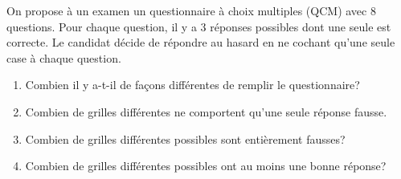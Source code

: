 \documentclass[a4paper]{article}
\newif\ifcorrection
\begin{document}
\exost 
On propose \`a un examen un questionnaire \`a choix multiples (QCM) avec 8 questions.
Pour chaque question, il y a 3 r\'eponses possibles dont une seule est correcte.
Le candidat d\'ecide de r\'epondre au hasard en ne cochant qu'une seule case \`a chaque question.
\begin{enumerate}
 \item Combien il y a-t-il de fa\c{c}ons diff\'erentes de remplir le questionnaire?
  \ifcorrection
 \textcolor{red}{
  On applique la formule d'un choix de $k=8$ \'el\'ements ordonn\'es parmis 3 avec remise:
  Il y a donc $\card{\Omega} = 3^8= 6561$ choix possibles.
 }
 \fi
 \item Combien de grilles diff\'erentes ne comportent qu'une seule r\'eponse fausse.
  \ifcorrection
 \textcolor{red}{
 Pour chaque question il y a 2 r\'eponses fausses. En supposant, toutes les autres r\'eponses justes, on fait la somme des r\'eponses fausses
 contenues dans le QCM, soit $2\times 8 = 16$ grilles diff\'erentes avec une seule faute.
 }
 \else
 \fi
 \item Combien de grilles diff\'erentes possibles sont enti\`erement fausses?
 \ifcorrection
 \textcolor{red}{
 Pour chaque question il y a 2 r\'eponses fausses. En supposant, toutes les autres r\'eponses justes, on fait la somme des r\'eponses fausses
 soit $2^8 = 256$ grilles diff\'erentes enti\`rement fausses.
 }
  \else
 \fi
  \item Combien de grilles diff\'erentes possibles ont au moins une bonne r\'eponse?
  \ifcorrection
 \textcolor{red}{
 On note $A$ l'\'ev\'enement $\{\text{``La grille est enti\`erement fausse''}\}$, donc $\bar{A} = \{ \text{``La grille contient une bonne r\'eponse''}\}$.
 Comme on sait que $\card{A}=256$ (cf. r\'eponse pr\'ec\'edente), alors $\card{\bar{A}} = 6561-256 = 6305$.
 }
 \else
 \fi
\end{enumerate}
\end{document}
